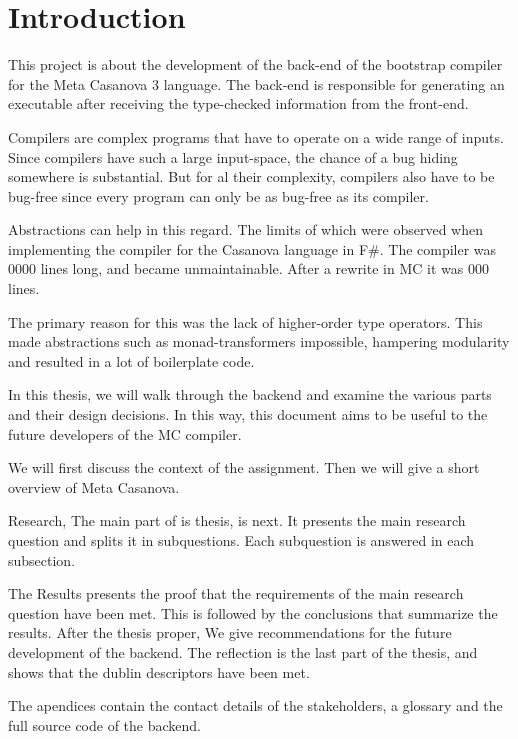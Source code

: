 \section{Introduction}
This project is about the development of the back-end of the bootstrap compiler for the Meta Casanova 3 language.
The back-end is responsible for generating an executable after receiving the type-checked information from the front-end.

Compilers are complex programs that have to operate on a wide range of inputs.
Since compilers have such a large input-space, the chance of a bug hiding somewhere is substantial. 
But for al their complexity, compilers also have to be bug-free since every program can only be as bug-free as its compiler.

Abstractions can help in this regard.
The limits of which were observed when implementing the compiler for the Casanova language in F\#.
The compiler was 0000 lines long, and became unmaintainable.
After a rewrite in MC it was 000 lines\cite{maggiore}.

The primary reason for this was the lack of higher-order type operators.
This made abstractions such as monad-transformers impossible, hampering modularity and resulted in a lot of boilerplate code.

In this thesis, we will walk through the backend and examine the various parts and their design decisions.
In this way, this document aims to be useful to the future developers of the MC compiler.

We will first discuss the context of the assignment.
Then we will give a short overview of Meta Casanova.

Research, The main part of is thesis, is next.
It presents the main research question and splits it in subquestions.
Each subquestion is answered in each subsection.

The Results presents the proof that the requirements of the main research question have been met.
This is followed by the conclusions that summarize the results.
After the thesis proper, We give recommendations for the future development of the backend.
The reflection is the last part of the thesis, and shows that the dublin descriptors have been met.

The apendices contain the contact details of the stakeholders, a glossary and the full source code of the backend.





